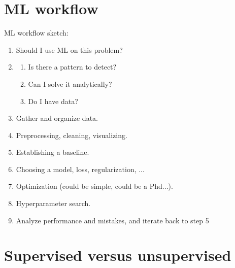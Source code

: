 \documentclass[a4paper, 12pt]{book}
\begin{document}
\section{ML workflow}
ML workflow sketch:
\begin{enumerate}
    \item  Should I use ML on this problem?
    \item \begin{enumerate}
        \item Is there a pattern to detect?
        \item Can I solve it analytically?
        \item Do I have data?
    \end{enumerate}
    \item Gather and organize data.
    \item Preprocessing, cleaning, visualizing.
    \item Establishing a baseline.
    \item Choosing a model, loss, regularization, ...
    \item Optimization (could be simple, could be a Phd...).
    \item Hyperparameter search.
    \item Analyze performance and mistakes, and iterate back to step 5
\end{enumerate}

\section{Supervised versus unsupervised}
\end{document}
